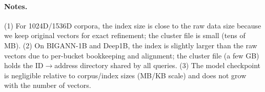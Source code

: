 \documentclass[sigconf,anonymous]{acmart}
\begin{document}
\paragraph{Notes.}
(1) For 1024D/1536D corpora, the index size is close to the raw data size because we keep original vectors for exact refinement; the cluster file is small (tens of MB).  
(2) On BIGANN-1B and Deep1B, the index is slightly larger than the raw vectors due to per-bucket bookkeeping and alignment; the cluster file (a few GB) holds the ID$\rightarrow$address directory shared by all queries.  
(3) The model checkpoint is negligible relative to corpus/index sizes (MB/KB scale) and does not grow with the number of vectors.
\end{document}
